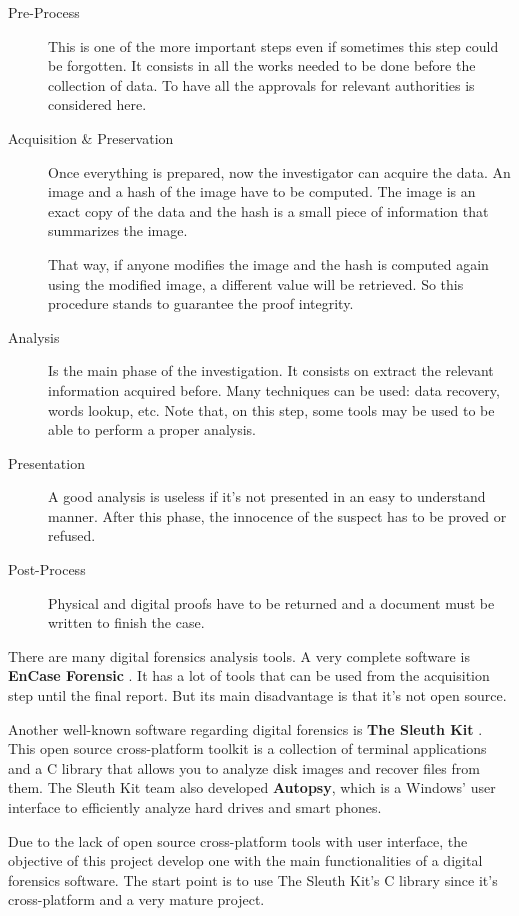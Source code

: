 \begin{description}
	\item [Pre-Process]
		This is one of the more important steps even if sometimes this step 
		could be forgotten. It consists in all the works needed to be done
		before the collection of data. To have all the approvals for relevant
		authorities is considered here.

	\item [Acquisition \& Preservation]
		Once everything is prepared, now the investigator can acquire 
		the data. An image and a hash of the image have to be computed.
		The image is an exact copy of the data and the hash is a small
		piece of information that summarizes the image.

		That way, if anyone modifies the image and the hash is computed
		again using the modified image, a different value will be 
		retrieved. So this procedure stands to guarantee the proof 
		integrity.

	\item [Analysis]
		Is the main phase of the investigation. It consists on extract
		the relevant information acquired before. Many techniques can be 
		used: data recovery, words lookup, etc. Note that, on this step,
		some tools may be used to be able to perform a proper analysis.

	\item [Presentation]
		A good analysis is useless if it's not presented in an easy to 
		understand manner. After this phase, the innocence of the
		suspect has to be proved or refused.

	\item [Post-Process]
		Physical and digital proofs have to be returned and a document 
		must be written to finish the case.

\end{description}

There are many digital forensics analysis tools. A very complete software is 
\textbf{EnCase Forensic} \cite{encase-web}. It has a lot of tools that can be 
used from the acquisition step until the final report. But its main disadvantage
is that it's not open source.

Another well-known software regarding digital forensics is \textbf{The Sleuth
Kit} \cite{tsk-web}. This open source cross-platform toolkit is a collection 
of terminal applications and a C library that allows you to analyze disk images
and recover files from them. The Sleuth Kit team also developed
\textbf{Autopsy}, which is a Windows' user interface to efficiently analyze
hard drives and smart phones.

Due to the lack of open source cross-platform tools with user interface, the
objective of this project develop one with the main functionalities of a 
digital forensics software. The start point is to use The Sleuth Kit's C
library since it's cross-platform and a very mature project.
